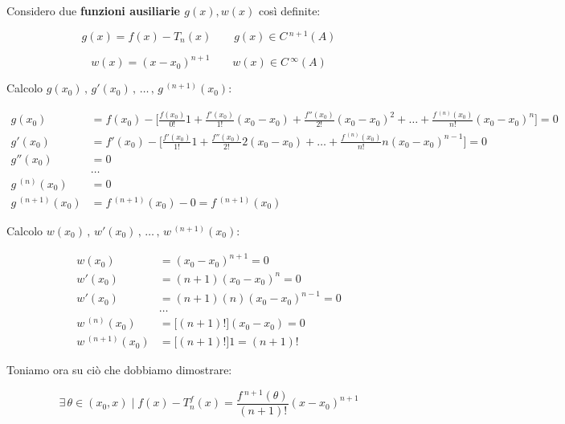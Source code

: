 \documentclass[../dimostrazioni]{subfiles}
\begin{document}
            \medskip

            Considero due \textbf{funzioni ausiliarie \(g(x), w(x)\)} così definite:

            \[  g(x) = f(x) - T_n (x) \qquad g(x) \in C\,^{n+1} (A)  \]

            \[  w(x) = (x - x_0)^{n+1} \qquad w(x) \in C\,^{\infty} (A)  \]

            \newpage

            Calcolo \( g(x_0)\, , \, g'(x_0)\, ,\, \dots\, , \, g \,^{(n+1)}(x_0)  \):
            
            \begin{align*}
                g(x_0) &= f(x_0) - \bigg[\frac{f(x_0)}{0!}1 + \frac{f'(x_0)}{1!}(x_0-x_0) + \frac{f''(x_0)}{2!}(x_0-x_0)^2 + \dots + \frac{f\,^{(n)}(x_0)}{n!}(x_0-x_0)^n \bigg] = 0\\
                g'(x_0) &= f'(x_0) - \bigg[\frac{f'(x_0)}{1!}1 + \frac{f''(x_0)}{2!}2(x_0-x_0) + \dots + \frac{f\,^{(n)}(x_0)}{n!}n(x_0-x_0)^{n-1} \bigg] = 0\\
                g''(x_0) &= 0\\
                &\dots\\
                g\,^{(n)} (x_0) &= 0\\
                g\,^{(n+1)} (x_0) &= f\,^{(n+1)}(x_0) - 0 = f\,^{(n+1)}(x_0)
            \end{align*}

            \bigskip
            
            Calcolo \( w(x_0)\, , \, w'(x_0)\, ,\, \dots\, , \, w \,^{(n+1)}(x_0)  \):

            \begin{align*}
                w(x_0) &= (x_0 - x_0)^{n+1} = 0\\
                w'(x_0) &= (n+1)(x_0 - x_0)^{n} = 0\\
                w'(x_0) &= (n+1)(n)(x_0 - x_0)^{n-1} = 0\\
                & \dots\\
                w\,^{(n)} (x_0) &= \big[(n+1)!\big](x_0 - x_0) = 0\\
                w\,^{(n+1)} (x_0) &= \big[(n+1)!\big] 1 = (n+1)!
            \end{align*}

            \bigskip

            Toniamo ora su ciò che dobbiamo dimostrare:

            \[  \exists \, \theta \in (x_0, x) \; | \; f(x) - T _n ^ f (x) = \frac{f\,^{n+1}(\theta)}{(n+1)!}(x-x_0)^{n+1} \]
\end{document}
